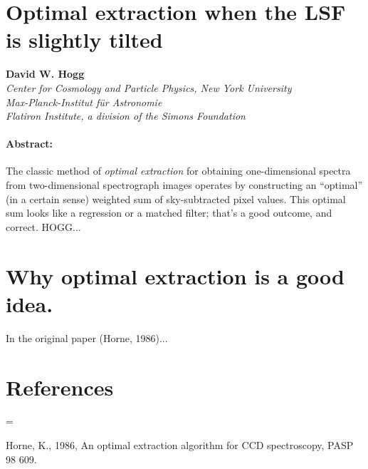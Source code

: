 \documentclass[12pt, letterpaper]{article}
\begin{document}
\sloppy\sloppypar\raggedbottom\frenchspacing

\section*{Optimal extraction when the LSF is slightly tilted}

\noindent
\textbf{David W. Hogg}\\
{\footnotesize
\textsl{Center for Cosmology and Particle Physics, New York University}\\
\textsl{Max-Planck-Institut f\"ur Astronomie}\\
\textsl{Flatiron Institute, a division of the Simons Foundation}
}

\paragraph{Abstract:}
The classic method of \emph{optimal extraction} for obtaining
one-dimensional spectra from two-dimensional spectrograph images
operates by constructing an ``optimal'' (in a certain sense) weighted
sum of sky-subtracted pixel values.
This optimal sum looks like a regression or a matched filter;
that's a good outcome, and correct.
HOGG...

\section{Why optimal extraction is a good idea.}

In the original paper (Horne, 1986)...

\section*{References}
\begin{list}{}{%
\rightmargin=0in
\leftmargin=\parindent
{}\leftmargin
{}\leftmargin
}
\item Horne, K., 1986,
An optimal extraction algorithm for CCD spectroscopy,
PASP 98 609.
\end{list}
\end{document}
